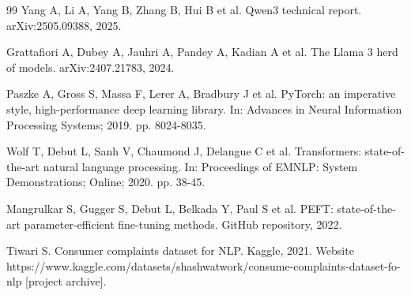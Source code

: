 \documentclass{elektr}
\begin{document}
\begin{thebibliography}{99}
 Yang A, Li A, Yang B, Zhang B, Hui B et al. Qwen3 technical report. arXiv:2505.09388, 2025.

 Grattafiori A, Dubey A, Jauhri A, Pandey A, Kadian A et al. The Llama 3 herd of models. arXiv:2407.21783, 2024.

 Paszke A, Gross S, Massa F, Lerer A, Bradbury J et al. PyTorch: an imperative style, high-performance deep learning library. In: Advances in Neural Information Processing Systems; 2019. pp. 8024-8035.

 Wolf T, Debut L, Sanh V, Chaumond J, Delangue C et al. Transformers: state-of-the-art natural language processing. In: Proceedings of EMNLP: System Demonstrations; Online; 2020. pp. 38-45.

 Mangrulkar S, Gugger S, Debut L, Belkada Y, Paul S et al. PEFT: state-of-the-art parameter-efficient fine-tuning methods. GitHub repository, 2022.

 Tiwari S. Consumer complaints dataset for NLP. Kaggle, 2021. Website https://www.kaggle.com/datasets/shashwatwork/consume-complaints-dataset-fo-nlp [project archive].

\end{thebibliography}
\end{document}
